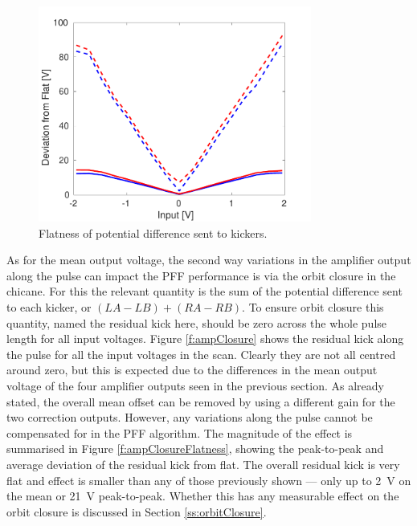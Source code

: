\begin{figure}
  \centering
  \includegraphics[width=0.8\textwidth]{Figures/commissioning/AmpFlatness}
  \caption{Flatness of potential difference sent to kickers.}
  \label{f:ampFlatness}
\end{figure}

As for the mean output voltage, the second way variations in the amplifier output along the pulse can impact the PFF performance is via the orbit closure in the chicane. For this the relevant quantity is the sum of the potential difference sent to each kicker, or \((LA-LB)+(RA-RB)\). To ensure orbit closure this quantity, named the residual kick here, should be zero across the whole pulse length for all input voltages. Figure \ref{f:ampClosure} shows the residual kick along the pulse for all the input voltages in the scan. Clearly they are not all centred around zero, but this is expected due to the differences in the mean output voltage of the four amplifier outputs seen in the previous section. As already stated, the overall mean offset can be removed by using a different gain for the two correction outputs. However, any variations along the pulse cannot be compensated for in the PFF algorithm. The magnitude of the effect is summarised in Figure \ref{f:ampClosureFlatness}, showing the peak-to-peak and average deviation of the residual kick from flat. The overall residual kick is very flat and effect is smaller than any of those previously shown --- only up to 2~V on the mean or 21~V peak-to-peak. Whether this has any measurable effect on the orbit closure is discussed in Section \ref{ss:orbitClosure}.

